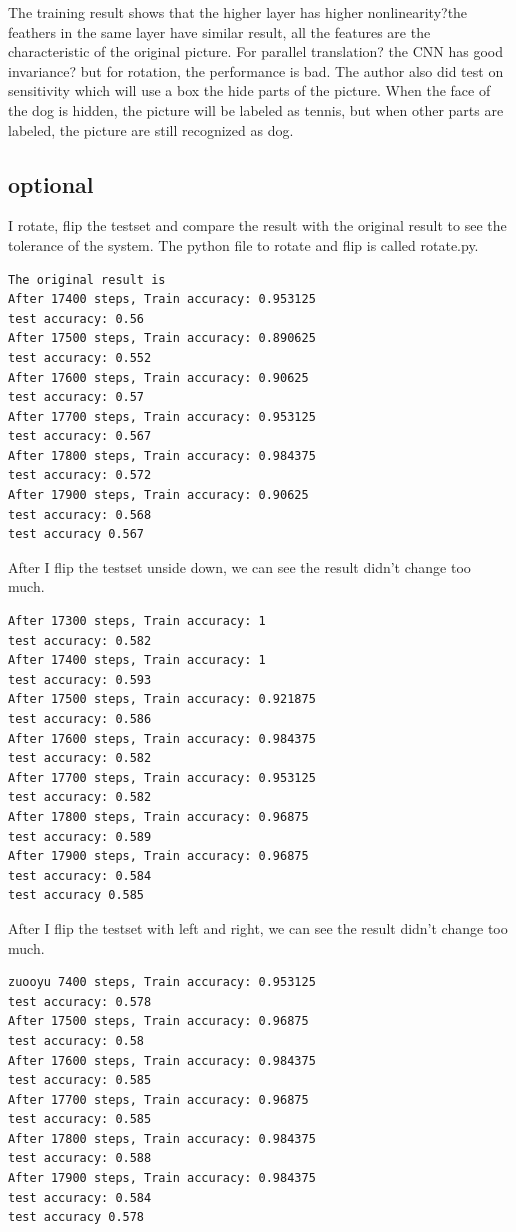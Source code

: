 \documentclass[12pt]{article}
\begin{document}
The training result shows that the higher layer has higher nonlinearity?the feathers in the same layer have similar result, all the features are the characteristic of the original picture. 
For parallel translation? the CNN has good invariance? but for rotation, the performance is bad. 
The author also did test on sensitivity which will use a box the hide parts of the picture. When the face of the dog is hidden, the picture will be labeled as tennis, but when other parts are labeled, the picture are still recognized as dog. 
\subsection{optional}
I rotate, flip  the testset and compare the result with the original result to see the tolerance of the system.
The python file to rotate and flip is called rotate.py.
\begin{lstlisting}
The original result is 
After 17400 steps, Train accuracy: 0.953125
test accuracy: 0.56
After 17500 steps, Train accuracy: 0.890625
test accuracy: 0.552
After 17600 steps, Train accuracy: 0.90625
test accuracy: 0.57
After 17700 steps, Train accuracy: 0.953125
test accuracy: 0.567
After 17800 steps, Train accuracy: 0.984375
test accuracy: 0.572
After 17900 steps, Train accuracy: 0.90625
test accuracy: 0.568
test accuracy 0.567
\end{lstlisting}

After I flip the testset unside down, we can see the result didn't change too much. 
\begin{lstlisting}
After 17300 steps, Train accuracy: 1
test accuracy: 0.582
After 17400 steps, Train accuracy: 1
test accuracy: 0.593
After 17500 steps, Train accuracy: 0.921875
test accuracy: 0.586
After 17600 steps, Train accuracy: 0.984375
test accuracy: 0.582
After 17700 steps, Train accuracy: 0.953125
test accuracy: 0.582
After 17800 steps, Train accuracy: 0.96875
test accuracy: 0.589
After 17900 steps, Train accuracy: 0.96875
test accuracy: 0.584
test accuracy 0.585
\end{lstlisting}



After I flip the testset with left and right, we can see the result didn't change too much. 
\begin{lstlisting}
zuooyu 7400 steps, Train accuracy: 0.953125
test accuracy: 0.578
After 17500 steps, Train accuracy: 0.96875
test accuracy: 0.58
After 17600 steps, Train accuracy: 0.984375
test accuracy: 0.585
After 17700 steps, Train accuracy: 0.96875
test accuracy: 0.585
After 17800 steps, Train accuracy: 0.984375
test accuracy: 0.588
After 17900 steps, Train accuracy: 0.984375
test accuracy: 0.584
test accuracy 0.578
\end{lstlisting}
\end{document}
